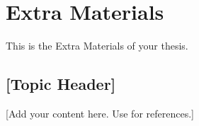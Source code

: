 \chapter{Extra Materials}
\label{chap:extramaterials}

This is the Extra Materials of your thesis.

\section{[Topic Header]}
[Add your content here. Use \cite{sample} for references.]
